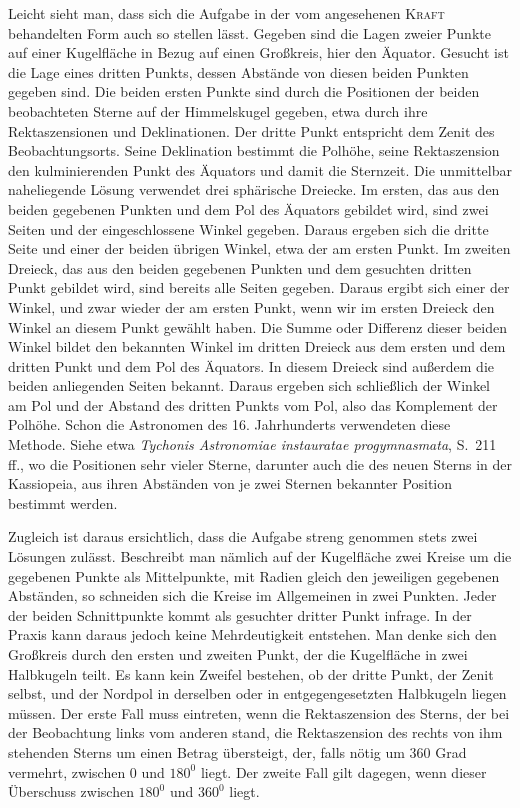 Leicht sieht man, dass sich die Aufgabe in der vom angesehenen \textsc{Kraft} behandelten Form auch so stellen lässt. \glqq{}Gegeben sind die Lagen zweier Punkte auf einer Kugelfläche in Bezug auf einen Großkreis, hier den Äquator. Gesucht ist die Lage eines dritten Punkts, dessen Abstände von diesen beiden Punkten gegeben sind.\grqq{} Die beiden ersten Punkte sind durch die Positionen der beiden beobachteten Sterne auf der Himmelskugel gegeben, etwa durch ihre Rektaszensionen und Deklinationen. Der dritte Punkt entspricht dem Zenit des Beobachtungsorts. Seine Deklination bestimmt die Polhöhe, seine Rektaszension den kulminierenden Punkt des Äquators und damit die Sternzeit. Die unmittelbar naheliegende Lösung verwendet drei sphärische Dreiecke. Im ersten, das aus den beiden gegebenen Punkten und dem Pol des Äquators gebildet wird, sind zwei Seiten und der eingeschlossene Winkel gegeben. Daraus ergeben sich die dritte Seite und einer der beiden übrigen Winkel, etwa der am ersten Punkt. Im zweiten Dreieck, das aus den beiden gegebenen Punkten und dem gesuchten dritten Punkt gebildet wird, sind bereits alle Seiten gegeben. Daraus ergibt sich einer der Winkel, und zwar wieder der am ersten Punkt, wenn wir im ersten Dreieck den Winkel an diesem Punkt gewählt haben. Die Summe oder Differenz dieser beiden Winkel bildet den bekannten Winkel im dritten Dreieck aus dem ersten und dem dritten Punkt und dem Pol des Äquators. In diesem Dreieck sind außerdem die beiden anliegenden Seiten bekannt. Daraus ergeben sich schließlich der Winkel am Pol und der Abstand des dritten Punkts vom Pol, also das Komplement der Polhöhe. Schon die Astronomen des 16. Jahrhunderts verwendeten diese Methode. Siehe etwa \textit{Tychonis Astronomiae instauratae progymnasmata}, S.~211 ff., wo die Positionen sehr vieler Sterne, darunter auch die des neuen Sterns in der Kassiopeia, aus ihren Abständen von je zwei Sternen bekannter Position bestimmt werden.

Zugleich ist daraus ersichtlich, dass die Aufgabe streng genommen stets zwei Lösungen zulässt. Beschreibt man nämlich auf der Kugelfläche zwei Kreise um die gegebenen Punkte als Mittelpunkte, mit Radien gleich den jeweiligen gegebenen Abständen, so schneiden sich die Kreise im Allgemeinen in zwei Punkten. Jeder der beiden Schnittpunkte kommt als gesuchter dritter Punkt infrage. In der Praxis kann daraus jedoch keine Mehrdeutigkeit entstehen. Man denke sich den Großkreis durch den ersten und zweiten Punkt, der die Kugelfläche in zwei Halbkugeln teilt. Es kann kein Zweifel bestehen, ob der dritte Punkt, der Zenit selbst, und der Nordpol in derselben oder in entgegengesetzten Halbkugeln liegen müssen. Der erste Fall muss eintreten, wenn die Rektaszension des Sterns, der bei der Beobachtung links vom anderen stand, die Rektaszension des rechts von ihm stehenden Sterns um einen Betrag übersteigt, der, falls nötig um $360$ Grad vermehrt, zwischen $0$ und $180^0$ liegt. Der zweite Fall gilt dagegen, wenn dieser Überschuss zwischen $180^0$ und $360^0$ liegt.

